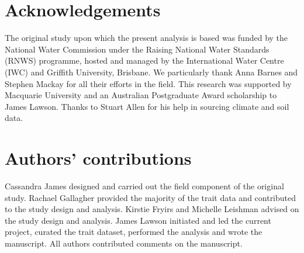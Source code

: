 \documentclass[openright,12pt,a4paper]{memoir}
\begin{document}
\section*{Acknowledgements}

The original  study upon which the present analysis is based was funded by the National Water Commission under the Raising National Water Standards (RNWS) programme, hosted and managed by the International Water Centre (IWC) and Griffith University, Brisbane. We particularly thank Anna Barnes and Stephen Mackay for all their efforts in the field. This research was supported by Macquarie University and an Australian Postgraduate Award scholarship to James Lawson. Thanks to Stuart Allen for his help in sourcing climate and soil data.

\section*{Authors' contributions}
Cassandra James designed and carried out the field component of the original study. Rachael Gallagher provided the majority of the trait data and contributed to the study design and analysis. Kirstie Fryirs and Michelle Leishman advised on the study design and analysis. James Lawson initiated and led the current project, curated the trait dataset, performed the analysis and wrote the manuscript. All authors contributed comments on the manuscript. 

\clearpage

\renewcommand\bibname{{References}} 
\begin{small}


\end{small}
\end{document}
